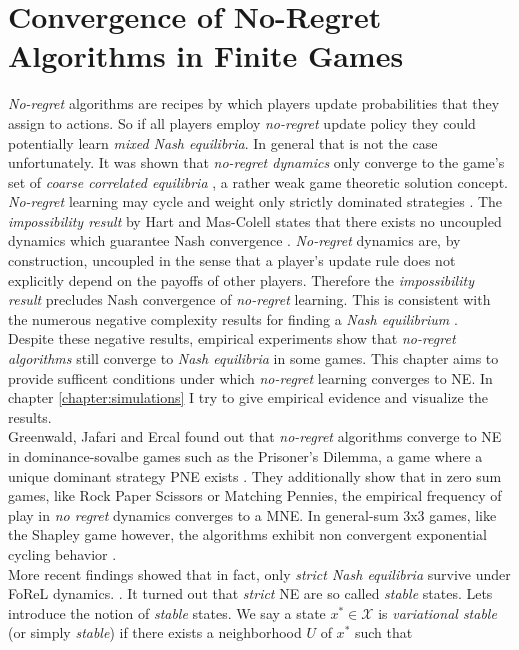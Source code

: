 \section{Convergence of No-Regret Algorithms in Finite Games}\label{section:convergence}

    
\textit{No-regret} algorithms are recipes by which players update probabilities that they assign to actions. So if all players employ \textit{no-regret} update policy they could potentially learn \textit{mixed Nash equilibria}. In general that is not the case unfortunately. It was shown that \textit{no-regret dynamics} only converge to the game's set of \textit{coarse correlated equilibria} \cite{flokas}, a rather weak game theoretic solution concept. \textit{No-regret} learning may cycle and weight only strictly dominated strategies \cite{mertikopoulos}. The \textit{impossibility result} by Hart and Mas-Colell states that there exists no uncoupled dynamics which guarantee Nash convergence \cite{hart}. \textit{No-regret} dynamics are, by construction, uncoupled in the sense that a player’s update rule does not explicitly depend on the payoffs of other players. Therefore the \textit{impossibility result} precludes Nash convergence of \textit{no-regret} learning. This is consistent with the numerous negative complexity results for finding a \textit{Nash equilibrium} \cite{chen, daskalakis}. \\

Despite these negative results, empirical experiments show that \textit{no-regret algorithms} still converge to \textit{Nash equilibria} in some games. This chapter aims to provide sufficent conditions under which \textit{no-regret} learning converges to NE. In chapter \ref{chapter:simulations} I try to give empirical evidence and visualize the results. \\

Greenwald, Jafari and Ercal found out that \textit{no-regret} algorithms converge to  NE in dominance-sovalbe games such as the Prisoner's Dilemma, a game where a unique dominant strategy PNE exists \cite{jafari}. They additionally show that in zero sum games, like Rock Paper Scissors or Matching Pennies, the empirical frequency of play in \textit{no regret} dynamics converges to a MNE. In general-sum 3x3 games, like the Shapley game however, the algorithms exhibit non convergent exponential cycling behavior \cite{jafari}. \\

More recent findings showed that in fact, only \textit{strict Nash equilibria} survive under FoReL dynamics. \cite{flokas}. It turned out that \textit{strict} NE are so called \textit{stable} states. Lets introduce the notion of \textit{stable} states. We say a state $x^* \in \mathcal{X}$ is \textit{variational stable} (or simply \textit{stable}) if there exists a neighborhood $U$ of $x^*$ such that \cite[Def. 2.3]{mertikopoulos}

